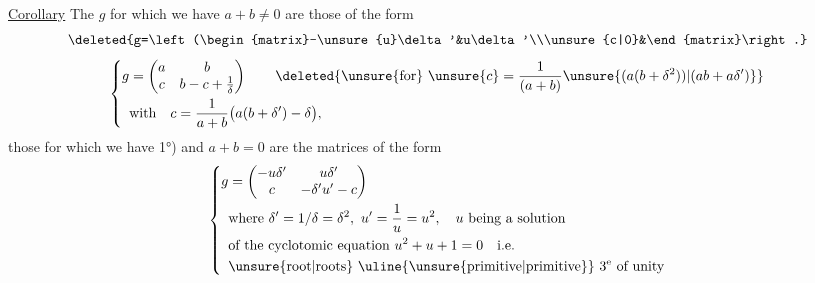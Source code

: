 
\uline{Corollary} The $g$ for which we have   $a+b\ne0$ are those of the form
\[
\deleted{g=\left(\begin{matrix}-\unsure{u}\delta'&u\delta'\\\unsure{c|0}&\end{matrix}\right.}
\]
\[
\left\{\begin{aligned}
g&=\begin{pmatrix}a&b\\c&b-c+\frac1\delta\end{pmatrix}\qquad\deleted{\unsure{\text{for}}\ \unsure{c}=\frac1{(a+b)}\unsure{(a(b+\delta^2))|(ab+a\delta')}}\\
&\text{with}\quad c=\frac1{a+b}\bigl(a(b+\delta')-\delta\bigr),
\end{aligned}\right.
\]
those for which we have 1°) and $a+b=0$ are  the matrices of the form
\[
\left\{\begin{aligned}
g&=\begin{pmatrix}-u\delta'&u\delta'\\c&-\delta'u'-c\end{pmatrix}\\
&\text{where }\delta'=1/\delta=\delta^2,\ u'=\frac1u=u^2,\quad u\text{ being a solution}\\
&\text{of the cyclotomic equation }u^2+u+1=0\quad\text{i.e.}\\
&\text{\unsure{root|roots} \uline{\unsure{primitive|primitive}} }3^{\mathrm e}\text{ of unity}
\end{aligned}\right.
\]
